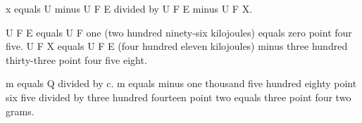x equals U minus U F E divided by U F E minus U F X.  

U F E equals U F one (two hundred ninety-six kilojoules) equals zero point four five.  
U F X equals U F E (four hundred eleven kilojoules) minus three hundred thirty-three point four five eight.  

m equals Q divided by c.  
m equals minus one thousand five hundred eighty point six five divided by three hundred fourteen point two equals three point four two grams.